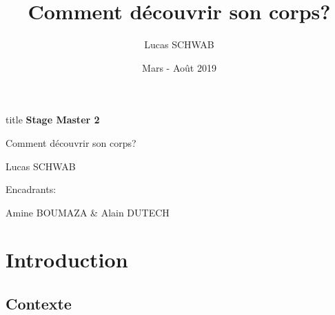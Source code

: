 \documentclass[french]{beamer}
\title{Comment découvrir son corps?}
\author{Lucas SCHWAB}
\date{Mars - Août 2019}
\begin{document}
\begin{frame}
    \begin{center}
        \begin{beamercolorbox}[sep=8pt,center]{title}
            \Huge \textbf{Stage Master 2}

            \huge Comment découvrir son corps?
        \end{beamercolorbox}
        \vfill

        Lucas SCHWAB

        \vfill

        Encadrants:

        Amine BOUMAZA
        \&
        Alain DUTECH
    \end{center}
\end{frame}


\begin{frame}
    \hfill
    \parbox[t]{.88\textwidth}{
        \begin{minipage}[c][0.75\textheight]{0.88\textwidth}
        \tableofcontents
        \end{minipage}
    }
\end{frame}

\section{Introduction}

\subsection{Contexte}

\end{document}
